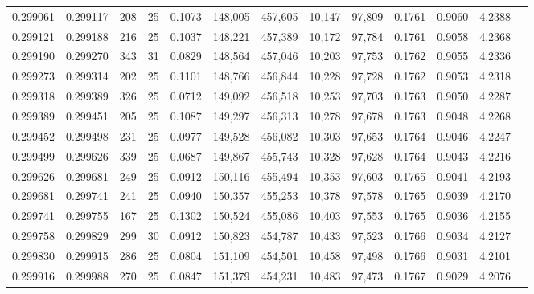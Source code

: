 \begin{tabular}{rrrrrrrrrrrrr}
0.299061 & 0.299117 &   208 &  25 &                                     0.1073 & 148,005 & 457,605 &  10,147 &  97,809 & 0.1761 & 0.9060 & 4.2388 \\
0.299121 & 0.299188 &   216 &  25 &                                     0.1037 & 148,221 & 457,389 &  10,172 &  97,784 & 0.1761 & 0.9058 & 4.2368 \\
0.299190 & 0.299270 &   343 &  31 &                                     0.0829 & 148,564 & 457,046 &  10,203 &  97,753 & 0.1762 & 0.9055 & 4.2336 \\
0.299273 & 0.299314 &   202 &  25 &                                     0.1101 & 148,766 & 456,844 &  10,228 &  97,728 & 0.1762 & 0.9053 & 4.2318 \\
0.299318 & 0.299389 &   326 &  25 &                                     0.0712 & 149,092 & 456,518 &  10,253 &  97,703 & 0.1763 & 0.9050 & 4.2287 \\
0.299389 & 0.299451 &   205 &  25 &                                     0.1087 & 149,297 & 456,313 &  10,278 &  97,678 & 0.1763 & 0.9048 & 4.2268 \\
0.299452 & 0.299498 &   231 &  25 &                                     0.0977 & 149,528 & 456,082 &  10,303 &  97,653 & 0.1764 & 0.9046 & 4.2247 \\
0.299499 & 0.299626 &   339 &  25 &                                     0.0687 & 149,867 & 455,743 &  10,328 &  97,628 & 0.1764 & 0.9043 & 4.2216 \\
0.299626 & 0.299681 &   249 &  25 &                                     0.0912 & 150,116 & 455,494 &  10,353 &  97,603 & 0.1765 & 0.9041 & 4.2193 \\
0.299681 & 0.299741 &   241 &  25 &                                     0.0940 & 150,357 & 455,253 &  10,378 &  97,578 & 0.1765 & 0.9039 & 4.2170 \\
0.299741 & 0.299755 &   167 &  25 &                                     0.1302 & 150,524 & 455,086 &  10,403 &  97,553 & 0.1765 & 0.9036 & 4.2155 \\
0.299758 & 0.299829 &   299 &  30 &                                     0.0912 & 150,823 & 454,787 &  10,433 &  97,523 & 0.1766 & 0.9034 & 4.2127 \\
0.299830 & 0.299915 &   286 &  25 &                                     0.0804 & 151,109 & 454,501 &  10,458 &  97,498 & 0.1766 & 0.9031 & 4.2101 \\
0.299916 & 0.299988 &   270 &  25 &                                     0.0847 & 151,379 & 454,231 &  10,483 &  97,473 & 0.1767 & 0.9029 & 4.2076 \\

\end{tabular}
